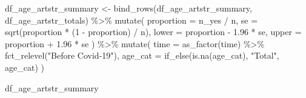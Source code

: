 \documentclass[
  letterpaper,
  DIV=11,
  numbers=noendperiod]{scrartcl}
\newenvironment{Shaded}{\begin{snugshade}}{\end{snugshade}}
\newcommand{\AttributeTok}[1]{\textcolor[rgb]{0.40,0.45,0.13}{#1}}
\newcommand{\DecValTok}[1]{\textcolor[rgb]{0.68,0.00,0.00}{#1}}
\newcommand{\FloatTok}[1]{\textcolor[rgb]{0.68,0.00,0.00}{#1}}
\newcommand{\FunctionTok}[1]{\textcolor[rgb]{0.28,0.35,0.67}{#1}}
\newcommand{\NormalTok}[1]{\textcolor[rgb]{0.00,0.23,0.31}{#1}}
\newcommand{\OtherTok}[1]{\textcolor[rgb]{0.00,0.23,0.31}{#1}}
\newcommand{\SpecialCharTok}[1]{\textcolor[rgb]{0.37,0.37,0.37}{#1}}
\newcommand{\StringTok}[1]{\textcolor[rgb]{0.13,0.47,0.30}{#1}}
\begin{document}
\begin{Shaded}
\begin{Highlighting}[]
\NormalTok{df\_age\_artstr\_summary }\OtherTok{\textless{}{-}} \FunctionTok{bind\_rows}\NormalTok{(df\_age\_artstr\_summary, df\_age\_artstr\_totals) }\SpecialCharTok{\%\textgreater{}\%}
  \FunctionTok{mutate}\NormalTok{(}
    \AttributeTok{proportion =}\NormalTok{ n\_yes }\SpecialCharTok{/}\NormalTok{ n,}
    \AttributeTok{se =} \FunctionTok{sqrt}\NormalTok{(proportion }\SpecialCharTok{*}\NormalTok{ (}\DecValTok{1} \SpecialCharTok{{-}}\NormalTok{ proportion) }\SpecialCharTok{/}\NormalTok{ n),}
    \AttributeTok{lower =}\NormalTok{ proportion }\SpecialCharTok{{-}} \FloatTok{1.96} \SpecialCharTok{*}\NormalTok{ se,}
    \AttributeTok{upper =}\NormalTok{ proportion }\SpecialCharTok{+} \FloatTok{1.96} \SpecialCharTok{*}\NormalTok{ se}
\NormalTok{  ) }\SpecialCharTok{\%\textgreater{}\%} 
  \FunctionTok{mutate}\NormalTok{(}
    \AttributeTok{time =} \FunctionTok{as\_factor}\NormalTok{(time) }\SpecialCharTok{\%\textgreater{}\%} 
      \FunctionTok{fct\_relevel}\NormalTok{(}\StringTok{"Before Covid{-}19"}\NormalTok{),}
    \AttributeTok{age\_cat =} \FunctionTok{if\_else}\NormalTok{(}\FunctionTok{is.na}\NormalTok{(age\_cat), }\StringTok{"Total"}\NormalTok{, age\_cat)}
\NormalTok{  )}

\NormalTok{df\_age\_artstr\_summary}
\end{Highlighting}
\end{Shaded}
\end{document}
